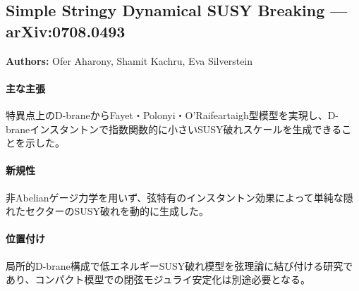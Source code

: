 \subsection{Simple Stringy Dynamical SUSY Breaking --- arXiv:0708.0493}

\textbf{Authors:} Ofer Aharony, Shamit Kachru, Eva Silverstein

\paragraph{主な主張}
特異点上のD-braneからFayet・Polonyi・O'Raifeartaigh型模型を実現し、D-braneインスタントンで指数関数的に小さいSUSY破れスケールを生成できることを示した\cite{Aharony:2007db}。

\paragraph{新規性}
非Abelianゲージ力学を用いず、弦特有のインスタントン効果によって単純な隠れたセクターのSUSY破れを動的に生成した。

\paragraph{位置付け}
局所的D-brane構成で低エネルギーSUSY破れ模型を弦理論に結び付ける研究であり、コンパクト模型での閉弦モジュライ安定化は別途必要となる。

